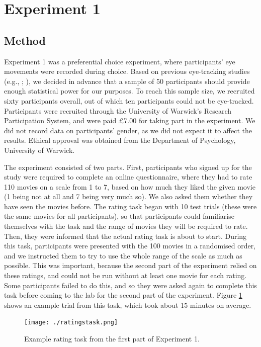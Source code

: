 \documentclass[11pt,a4paper]{article}
\begin{document}
\section{Experiment 1}

\subsection{Method} \label{chap1exp1method}

Experiment 1 was a preferential choice experiment, where participants' eye movements were recorded during choice. Based on previous eye-tracking studies (e.g., ; ), we decided in advance that a sample of 50 participants should provide enough statistical power for our purposes. To reach this sample size, we recruited sixty participants overall, out of which ten participants could not be eye-tracked. Participants were recruited through the University of Warwick's Research Participation System, and were paid £7.00 for taking part in the experiment. We did not record data on participants' gender, as we did not expect it to affect the results. Ethical approval was obtained from the Department of Psychology, University of Warwick.

The experiment consisted of two parts. First, participants who signed up for the study were required to complete an online questionnaire, where they had to rate 110 movies on a scale from 1 to 7, based on how much they liked the given movie (1 being not at all and 7 being very much so). We also asked them whether they have seen the movies before. The rating task began with 10 test trials (these were the same movies for all participants), so that participants could familiarise themselves with the task and the range of movies they will be required to rate. Then, they were informed that the actual rating task is about to start. During this task, participants were presented with the 100 movies in a randomised order, and we instructed them to try to use the whole range of the scale as much as possible. This was important, because the second part of the experiment relied on these ratings, and could not be run without at least one movie for each rating. Some participants failed to do this, and so they were asked again to complete this task before coming to the lab for the second part of the experiment. Figure \ref{fig:ratingstask} shows an example trial from this task, which took about 15 minutes on average. 

\begin{figure}[htb!]
\captionsetup{justification=centering}
\centering
\caption{Example rating task from the first part of Experiment 1. }
\texttt{[image: ./ratingstask.png]}
\label{fig:ratingstask}
\end{figure}
\end{document}
